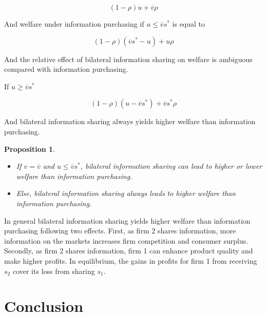 \documentclass[a4paper,leqno]{article}%
\newtheorem{prop}{Proposition}
\newcommand{\ov}{\overline{v}}
\begin{document}
\medskip

\[
(1-\rho) u +\ov \rho
\]

\medskip

And welfare under information purchasing if $u\leq \ov s^*$ is equal to

\medskip

\[
(1-\rho) (\ov s^*-u)+u\rho
\]

\medskip

And the relative effect of bilateral information sharing on welfare is ambiguous compared with information purchasing.

\medskip

If $u\geq \ov s^*$ 

\[
(1-\rho) (u-\ov s^*)+\ov s^*\rho
\]

And bilateral information sharing always yields higher welfare than information purchasing.


\medskip

\begin{prop}~~

\begin{itemize}
    \item If $v=\ov$ and $u\leq \ov s^*$, bilateral information sharing can lead to higher or lower welfare than information purchasing. 
    \item Else, bilateral information sharing always leads to higher welfare than information purchasing.
\end{itemize}

\end{prop}

\medskip

In general bilateral information sharing yields higher welfare than information purchasing following two effects. First, as firm 2 shares information, more information on the markets increases firm competition and consumer surplus. Secondly, as firm 2 shares information, firm 1 can enhance product quality and make higher profits. In equilibrium, the gains in profits for firm 1 from receiving $s_2$ cover its loss from sharing $s_1$. 

\medskip

\section{Conclusion}\label{disc}
\end{document}
